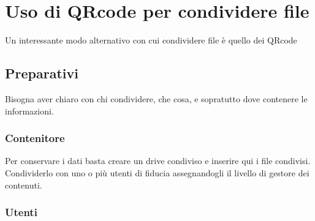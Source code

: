 \chapter{Uso di QRcode per condividere file}
Un interessante modo alternativo con cui condividere file  è quello dei QRcode~\cite{itwiki:138886025}
\section{Preparativi}
Bisogna aver chiaro  con chi condividere, che cosa, e sopratutto dove contenere le informazioni. 
\subsection*{Contenitore} Per conservare i dati basta creare  un drive condiviso e inserire qui i file condivisi. Condividerlo con uno o più utenti di fiducia assegnandogli il livello di gestore dei contenuti.
\subsection*{Utenti}